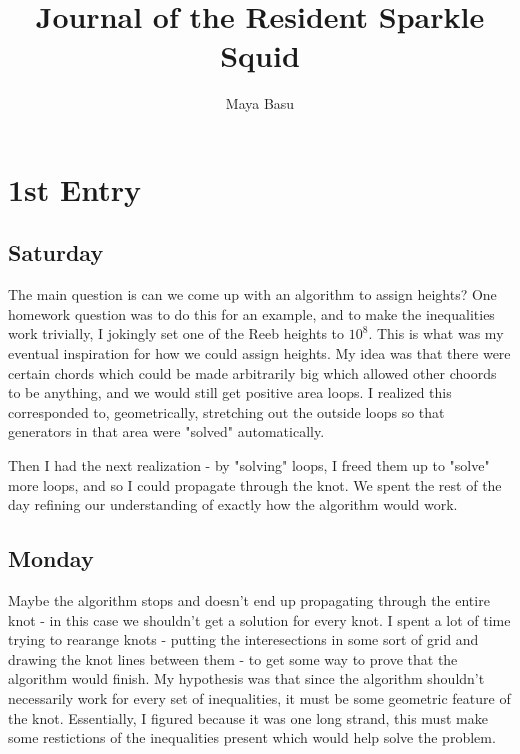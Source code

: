 \documentclass[11pt,oneside]{amsart}
\begin{document}
\author{Maya Basu}


\address{University of California, Berkeley}



\title{Journal of the Resident Sparkle Squid}
\maketitle



\section{1st Entry}

\subsection{Saturday} The main question is can we come up with an algorithm to assign heights? One homework question was to do this for an example, and to make the inequalities work trivially, I jokingly set one of the Reeb heights to $10^8$. This is what was my eventual inspiration for how we could assign heights. My idea was that there were certain chords which could be made arbitrarily big which allowed other choords to be anything, and we would still get positive area loops. I realized this corresponded to, geometrically, stretching out the outside loops so that generators in that area were "solved" automatically. 

Then I had the next realization - by "solving" loops, I freed them up to "solve" more loops, and so I could propagate through the knot. 
We spent the rest of the day refining our understanding of exactly how the algorithm would work. 



\subsection{Monday} Maybe the algorithm stops and doesn't end up propagating through the entire knot - in this case we shouldn't get a solution for every knot. I spent a lot of time trying to rearange knots - putting the interesections in some sort of grid and drawing the knot lines between them - to get some way to prove that the algorithm would finish. My hypothesis was that since the algorithm shouldn't necessarily work for every set of inequalities, it must be some geometric feature of the knot. Essentially, I figured because it was one long strand, this must make some restictions of the inequalities present which would help solve the problem.
\end{document}
